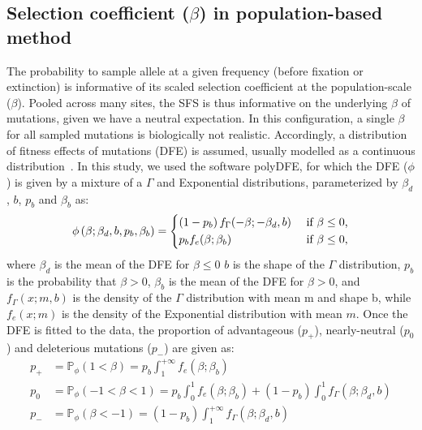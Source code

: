 \documentclass{article}
\newcommand{\proba}{\mathbb{P}}
\newcommand{\Spop}{\beta}
\begin{document}
    \subsection{Selection coefficient ($\Spop$) in population-based method}
    \label{subsec:s-polymorphism-method}
    The probability to sample allele at a given frequency (before fixation or extinction) is informative of its scaled selection coefficient at the population-scale ($\Spop$).
    Pooled across many sites, the SFS is thus informative on the underlying $\Spop$ of mutations, given we have a neutral expectation.
    In this configuration, a single $\Spop$ for all sampled mutations is biologically not realistic.
    Accordingly, a distribution of fitness effects of mutations (DFE) is assumed, usually modelled as a continuous distribution~\cite{eyre-walker_distribution_2006, eyre-walker_estimating_2009}.
    In this study, we used the software polyDFE\cite{tataru_inference_2017, tataru_polydfe_2020}, for which the DFE ($\phi$) is given by a mixture of a $\Gamma$ and Exponential distributions, parameterized by $\Spop_d$ , $b$, $p_b$
    and $\Spop_b$ as:
    \begin{equation*}
        \phi \left( \Spop; \Spop_d , b, p_b, \Spop_b \right) =
        \begin{dcases}
            \left( 1 - p_b \right) f_{\Gamma}(-\Spop; -\Spop_d, b) & \text{ if $\Spop \leq 0$,} \\
            p_b f_{e}(\Spop; \Spop_b) & \text{ if $\Spop \leq 0$,} \\
        \end{dcases}
    \end{equation*}
    where $\Spop_d$ is the mean of the DFE for $\Spop \leq 0$
    $b$ is the shape of the $\Gamma$ distribution,
    $p_b$ is the probability that $\Spop > 0$,
    $\Spop_b$ is the mean of the DFE for $\Spop > 0$,
    and $f_{\Gamma}(x; m, b)$ is the density of the $\Gamma$ distribution with mean m and shape b, while $f_{e}(x; m)$ is the density of the Exponential distribution with mean $m$.
    Once the DFE is fitted to the data, the proportion of advantageous ($p_+$), nearly-neutral ($p_0$) and deleterious mutations ($p_-$) are given as:
    \begin{align*}
        p_+ &= \proba_{\phi} \left( 1 < \Spop \right) = p_b \int_{1}^{+\infty} f_{e}(\Spop; \Spop_b)  \\
        p_0 &= \proba_{\phi} \left( -1 < \Spop < 1 \right) = p_b \int_{0}^{1} f_{e}(\Spop; \Spop_b) + \left( 1 - p_b \right) \int_{0}^{1} f_{\Gamma}(\Spop; \Spop_d, b) \\
        p_- &= \proba_{\phi} \left( \Spop < -1 \right) = \left( 1 - p_b \right) \int_{1}^{+\infty} f_{\Gamma}(\Spop; \Spop_d, b)
    \end{align*}
\end{document}
